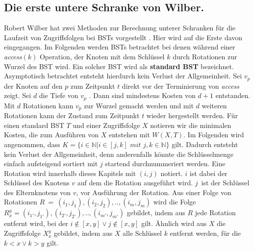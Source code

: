 \documentclass[a4paper,12pt]{article}
\begin{document}
\subsection{Die erste untere Schranke von Wilber.} \label{wilberBound}
Robert Wilber hat zwei Methoden zur Berechnung unterer Schranken für die Laufzeit von Zugriffsfolgen bei BSTs vorgestellt \cite{wilberLowerBounds}. Hier wird auf die Erste davon eingegangen. Im Folgenden werden BSTs betrachtet bei denen während einer \textit{access$(k)$} Operation, der Knoten mit dem Schlüssel $k$ durch Rotationen zur Wurzel des BST wird. Ein solcher BST wird als \textbf{standard BST} bezeichnet. Asymptotisch betrachtet entsteht hierdurch kein Verlust der Allgemeinheit. Sei $v_p$ der Knoten auf den $p$ zum Zeitpunkt $t$ direkt vor der Terminierung von \textit{access} zeigt. Sei $d$ die Tiefe von $v_p$ . Dann sind mindestens Kosten von $d + 1$ entstanden. Mit $d$ Rotationen kann $v_p$ zur Wurzel gemacht werden und mit $d$ weiteren Rotationen kann der Zustand zum Zeitpunkt $t$ wieder hergestellt werden.
Für einen standard BST $T$ und einer Zugriffsfolge $X$ notieren wir die minimalen Kosten, die zum Ausführen von $X$ entstehen mit $W(X, T)$. Im Folgenden wird angenommen, dass 
$K = \{  i \in \mathbb{N} \vert i \in \left[j,k\right] \textit{ mit } j,k \in  \mathbb{N} \} $ gilt. Dadurch entsteht kein Verlust der Allgemeinheit, denn anderenfalls könnte die Schlüsselmenge einfach aufsteigend sortiert mit $j$ startend durchnummeriert werden. Eine Rotation wird innerhalb dieses Kapitels mit $\left(i, j\right)$ notiert. $i$ ist dabei der Schlüssel des Knotens $v$ auf dem die Rotation ausgeführt wird. $j$~ist der Schlüssel des Elternknotens von $v$, vor Ausführung der Rotation. Aus einer Folge von Rotationen $R~=~\left(i_1,j_1 \right),\left(i_2,j_2 \right),..,\left(i_m,j_m \right)$ wird die Folge  $R^y_x = \left(i_{1'},j_{1'}\right),\left(i_{2'},j_{2'} \right),..,\left(i_{m'},j_{m'} \right)$ gebildet, indem aus $R$ jede Rotation entfernt wird, bei der $i\notin \left[x,y\right] \lor j\notin \left[x,y\right]$ gilt. Ähnlich wird aus $X$ die Zugriffsfolge $X^y_x$ gebildet, indem aus $X$ alle Schlüssel $k$ entfernt werden, für die $k < x  \lor k > y$ gilt.
\end{document}
